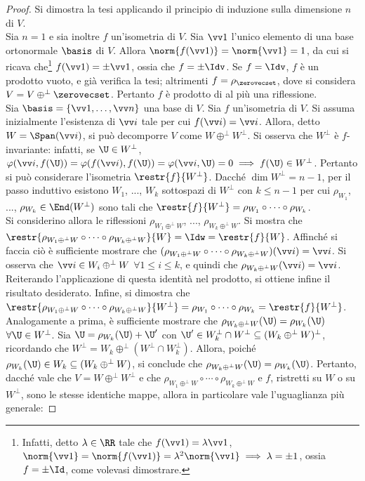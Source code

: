 \begin{proof}
	Si dimostra la tesi applicando il principio di induzione sulla dimensione $n$
	di $V$. \\
	
	\basestep Sia $n = 1$ e sia inoltre $f$ un'isometria di $V$. Sia $\vv 1$ l'unico elemento di una base ortonormale $\basis$ di $V$. Allora $\norm{f(\vv 1)} = \norm{\vv 1} = 1$, da cui si ricava che\footnote{Infatti, detto $\lambda \in \RR$ tale che $f(\vv 1) = \lambda \vv 1$, $\norm{\vv 1} = \norm{f(\vv 1)} = \lambda^2 \norm{\vv 1} \implies \lambda = \pm 1$, ossia $f = \pm \Id$, come volevasi dimostrare.} $f(\vv 1) = \pm \vv 1$,
	ossia che $f = \pm \Idv$. Se $f = \Idv$, $f$ è un prodotto vuoto, e già verifica la tesi; altrimenti
	$f = \rho_{\zerovecset}$, dove si considera $V = V \oplus^\perp \zerovecset$. Pertanto $f$ è prodotto
	di al più una riflessione. \\
	
	\inductivestep Sia $\basis = \{ \vv1, \ldots, \vv n \}$ una base di $V$. Sia $f$ un'isometria di $V$. Si
	assuma inizialmente l'esistenza di $\vv i$ tale per cui $f(\vv i) = \vv i$. Allora, detto $W = \Span(\vv i)$, si può decomporre $V$ come $W \oplus^\perp W^\perp$. Si osserva che $W^\perp$ è $f$-invariante: infatti,
	se $\U \in W^\perp$, $\varphi(\vv i, f(\U)) = \varphi(f(\vv i), f(\U)) = \varphi(\vv i, \U) = 0 \implies
	f(\U) \in W^\perp$. Pertanto si può considerare l'isometria $\restr{f}{W^\perp}$. Dacché $\dim W^\perp = n - 1$,
	per il passo induttivo esistono $W_1$, ..., $W_k$ sottospazi di $W^\perp$ con $k \leq n-1$ per cui $\rho_{W_1}$, ..., $\rho_{W_k} \in \End(W^\perp)$ sono tali che $\restr{f}{W^\perp} = \rho_{W_1} \circ \cdots \circ \rho_{W_k}$. \\
	
	Si considerino allora le riflessioni $\rho_{W_1 \oplus^\perp W}$, ..., $\rho_{W_k \oplus^\perp W}$.
	Si mostra che $\restr{\rho_{W_1 \oplus^\perp W} \circ \cdots \circ \rho_{W_k \oplus^\perp W}}{W} = \Idw = \restr{f}{W}$.
	Affinché si faccia ciò è sufficiente mostrare che $(\rho_{W_1 \oplus^\perp W} \circ \cdots \circ \rho_{W_k \oplus^\perp W})(\vv i) = \vv i$. Si osserva che $\vv i \in W_i \oplus^\perp W$ $\forall 1 \leq i \leq k$, e
	quindi che $\rho_{W_k \oplus^\perp W}(\vv i) = \vv i$. Reiterando l'applicazione di questa identità nel prodotto,
	si ottiene infine il risultato desiderato. Infine, si dimostra che $\restr{\rho_{W_1 \oplus^\perp W} \circ \cdots \circ \rho_{W_k \oplus^\perp W}}{W^\perp} = \rho_{W_1} \circ \cdots \circ \rho_{W_k} = \restr{f}{W^\perp}$. Analogamente a prima,
	è sufficiente mostrare che $\rho_{W_k \oplus^\perp W}(\U) = \rho_{W_k}(\U)$ $\forall \U \in W^\perp$.
	Sia $\U = \rho_{W_k}(\U) + \U'$ con $\U' \in W_k^\perp \cap W^\perp \subseteq (W_k \oplus^\perp W)^\perp$,
	ricordando che $W^\perp = W_k \oplus^\perp (W^\perp \cap W_k^\perp)$.
	Allora, poiché $\rho_{W_k}(\U) \in W_k \subseteq (W_k \oplus^\perp W)$, si conclude che
	$\rho_{W_k \oplus^\perp W}(\U) = \rho_{W_k}(\U)$. Pertanto, dacché vale che $V = W \oplus^\perp W^\perp$ e che $\rho_{W_1 \oplus^\perp W} \circ \cdots \circ \rho_{W_k \oplus^\perp W}$ e $f$, ristretti su $W$ o su $W^\perp$, sono le stesse identiche mappe, allora
	in particolare vale l'uguaglianza più generale:
	

\end{proof}

